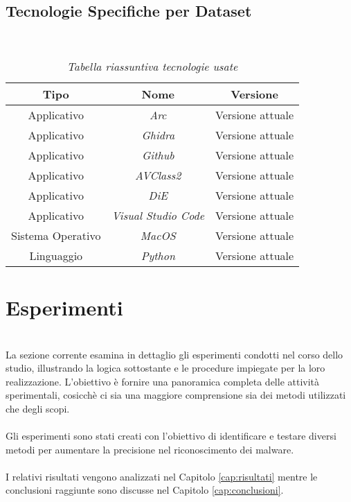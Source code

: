 \subsection{Tecnologie Specifiche per Dataset}
~\\
\hfill
\begin{table}[!h]
    \centering
    \begin{tabular}{|c|c|c|}
        \hline
        \textbf{Tipo} & \textbf{Nome} & \textbf{Versione} \\
        \hline
        Applicativo & \emph{Arc} & Versione attuale \\
        \hline
        Applicativo & \emph{Ghidra} & Versione attuale \\
        \hline
        Applicativo & \emph{Github} & Versione attuale \\
        \hline
        Applicativo & \emph{AVClass2} & Versione attuale \\
        \hline
        Applicativo & \emph{DiE} & Versione attuale \\
        \hline
        Applicativo & \emph{Visual Studio Code} & Versione attuale \\
        \hline
        Sistema Operativo & \emph{MacOS} & Versione attuale \\
        \hline
        Linguaggio & \emph{Python} & Versione attuale \\
        \hline
    \end{tabular}
    \caption{\emph{Tabella riassuntiva tecnologie usate}}
    \label{table-tecnologie}
\end{table}

\section{Esperimenti}
~\\
\indent La sezione corrente esamina in dettaglio gli esperimenti condotti nel corso dello studio, illustrando la logica sottostante e le procedure impiegate per la loro realizzazione. 
L'obiettivo è fornire una panoramica completa delle attività sperimentali, cosicchè ci sia una maggiore comprensione sia dei metodi utilizzati che degli scopi.
\\\\
Gli esperimenti sono stati creati con l'obiettivo di identificare e testare diversi metodi per aumentare la precisione nel riconoscimento dei malware.
\\\\
I relativi risultati vengono analizzati nel Capitolo \ref{cap:risultati} mentre le conclusioni raggiunte sono discusse nel Capitolo \ref{cap:conclusioni}.

